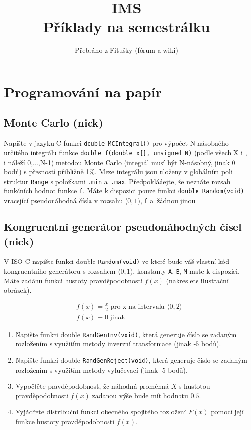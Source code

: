 \documentclass[11pt]{article} %
\title{IMS\\Příklady na semestrálku}
\author{Přebráno z Fitušky (fórum a wiki)}
\begin{document}
\maketitle


\section{Programování na papír}



\subsection{Monte Carlo (nick)}

Napište v jazyku C funkci \texttt{double MCIntegral()} pro výpočet N-násobného určitého integrálu funkce \texttt{double f(double x[], unsigned N)} (podle všech X i , i náleží {0,...,N-1}) metodou Monte Carlo (integrál musí být N-násobný, jinak 0 bodů) s přesností přibližně 1\%. Meze integrálu jsou uloženy v globálním poli struktur \texttt{Range} s položkami \texttt{.min} a~\texttt{.max}. Předpokládejte, že neznáte rozsah funkčních hodnot funkce \texttt{f}. Máte k dispozici pouze funkci \texttt{double Random(void)} vracející pseudonáhodná čísla v rozsahu  $\langle 0,1)$, \texttt{f} a~žádnou jinou





\subsection{Kongruentní generátor pseudonáhodných čísel (nick)}
V ISO C napište funkci double \texttt{Random(void)} ve které bude váš vlastní kód kongruentního generátoru s rozsahem $\langle 0,1)$, konstanty \texttt{A}, \texttt{B}, \texttt{M} máte k dispozici. Máte zadánu funkci hustoty pravděpodobnosti $f(x)$ (nakreslete ilustrační obrázek).

\begin{align}
&f(x) = \frac{x}{2} \text{ pro x na intervalu $\langle0,2$)} \\
&f(x) = 0 \text{ jinak}
\end{align}

\begin{enumerate}
\item Napište funkci double \texttt{RandGenInv(void)}, která generuje číslo se zadaným rozložením s využitím metody inverzní transformace (jinak -5 bodů).
\item Napište funkci double \texttt{RandGenReject(void)}, která generuje číslo se zadaným rozložením s využitím metody vylučovací (jinak -5 bodů).
\item Vypočtěte pravděpodobnost, že náhodná proměnná $X$ s hustotou pravděpodobnosti $f(x)$ zadanou výše bude mít hodnotu $0.5$.
\item Vyjádřete distribuční funkci obecného spojitého rozložení $F(x)$ pomocí její funkce hustoty pravděpodobnosti $f(x)$.
\end{enumerate}
\end{document}

